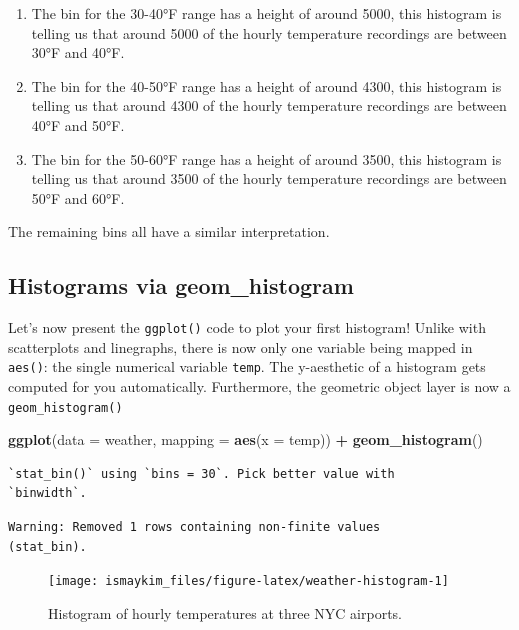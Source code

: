 \documentclass[12pt, krantz2,]{krantz}
\makeatletter
\newenvironment{Shaded}{\begin{snugshade}}{\end{snugshade}}
\newcommand{\DataTypeTok}[1]{\textcolor[rgb]{0.27,0.27,0.27}{#1}}
\newcommand{\KeywordTok}[1]{\textcolor[rgb]{0.27,0.27,0.27}{\textbf{#1}}}
\newcommand{\NormalTok}[1]{#1}
\newcommand{\OperatorTok}[1]{\textcolor[rgb]{0.43,0.43,0.43}{\textbf{#1}}}
\newcommand{\StringTok}[1]{\textcolor[rgb]{0.5,0.5,0.5}{#1}}
\providecommand{\tightlist}{%
  \setlength{\itemsep}{0pt}\setlength{\parskip}{0pt}}
\newenvironment{kframe}{%
\medskip{}
\setlength{\fboxsep}{.8em}
 \def\at@end@of@kframe{}%
 \ifinner\ifhmode%
  \def\at@end@of@kframe{\end{minipage}}%
  \begin{minipage}{\columnwidth}%
 \fi\fi%
 \def\FrameCommand##1{\hskip\@totalleftmargin \hskip-\fboxsep
 \colorbox{shadecolor}{##1}\hskip-\fboxsep
     \hskip-\linewidth \hskip-\@totalleftmargin \hskip\columnwidth}%
 \MakeFramed {\advance\hsize-\width
   \@totalleftmargin\z@ \linewidth\hsize
   \@setminipage}}%
 {\par\unskip\endMakeFramed%
 \at@end@of@kframe}
\renewenvironment{Shaded}{\begin{kframe}}{\end{kframe}}
\makeatother
\begin{document}
\begin{enumerate}
\def\labelenumi{\arabic{enumi}.}
\tightlist
\item
  The bin for the 30-40°F range has a height of around 5000, this histogram is telling us that around 5000 of the hourly temperature recordings are between 30°F and 40°F.
\item
  The bin for the 40-50°F range has a height of around 4300, this histogram is telling us that around 4300 of the hourly temperature recordings are between 40°F and 50°F.
\item
  The bin for the 50-60°F range has a height of around 3500, this histogram is telling us that around 3500 of the hourly temperature recordings are between 50°F and 60°F.
\end{enumerate}

The remaining bins all have a similar interpretation.

\hypertarget{geomhistogram}{%
\subsection{Histograms via geom\_histogram}\label{geomhistogram}}

Let's now present the \texttt{ggplot()} code to plot your first histogram! Unlike with scatterplots and linegraphs, there is now only one variable being mapped in \texttt{aes()}: the single numerical variable \texttt{temp}. The y-aesthetic of a histogram gets computed for you automatically. Furthermore, the geometric object layer is now a \texttt{geom\_histogram()}

\begin{Shaded}
\begin{Highlighting}[]
\KeywordTok{ggplot}\NormalTok{(}\DataTypeTok{data =}\NormalTok{ weather, }\DataTypeTok{mapping =} \KeywordTok{aes}\NormalTok{(}\DataTypeTok{x =}\NormalTok{ temp)) }\OperatorTok{+}
\StringTok{  }\KeywordTok{geom_histogram}\NormalTok{()}
\end{Highlighting}
\end{Shaded}

\begin{verbatim}
`stat_bin()` using `bins = 30`. Pick better value with
`binwidth`.
\end{verbatim}

\begin{verbatim}
Warning: Removed 1 rows containing non-finite values
(stat_bin).
\end{verbatim}

\begin{figure}

{\centering \texttt{[image: ismaykim\_files/figure-latex/weather-histogram-1]} 

}

\caption{Histogram of hourly temperatures at three NYC airports.}\label{fig:weather-histogram}
\end{figure}
\end{document}
